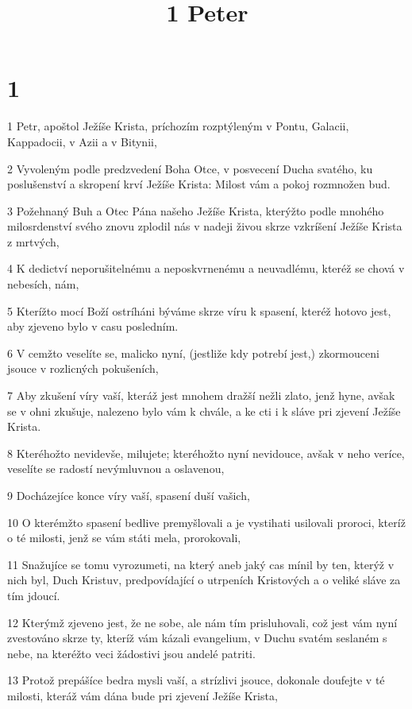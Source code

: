 

\title{1 Peter}

\chapter{1}

\par 1 Petr, apoštol Ježíše Krista, príchozím rozptýleným v Pontu, Galacii, Kappadocii, v Azii a v Bitynii,
\par 2 Vyvoleným podle predzvedení Boha Otce, v posvecení Ducha svatého, ku poslušenství a skropení krví Ježíše Krista: Milost vám a pokoj rozmnožen bud.
\par 3 Požehnaný Buh a Otec Pána našeho Ježíše Krista, kterýžto podle mnohého milosrdenství svého znovu zplodil nás v nadeji živou skrze vzkríšení Ježíše Krista z mrtvých,
\par 4 K dedictví neporušitelnému a neposkvrnenému a neuvadlému, kteréž se chová v nebesích, nám,
\par 5 Kterížto mocí Boží ostríháni býváme skrze víru k spasení, kteréž hotovo jest, aby zjeveno bylo v casu posledním.
\par 6 V cemžto veselíte se, malicko nyní, (jestliže kdy potrebí jest,) zkormouceni jsouce v rozlicných pokušeních,
\par 7 Aby zkušení víry vaší, kteráž jest mnohem dražší nežli zlato, jenž hyne, avšak se v ohni zkušuje, nalezeno bylo vám k chvále, a ke cti i k sláve pri zjevení Ježíše Krista.
\par 8 Kteréhožto nevidevše, milujete; kteréhožto nyní nevidouce, avšak v neho veríce, veselíte se radostí nevýmluvnou a oslavenou,
\par 9 Docházejíce konce víry vaší, spasení duší vašich,
\par 10 O kterémžto spasení bedlive premyšlovali a je vystihati usilovali proroci, kteríž o té milosti, jenž se vám státi mela, prorokovali,
\par 11 Snažujíce se tomu vyrozumeti, na který aneb jaký cas mínil by ten, kterýž v nich byl, Duch Kristuv, predpovídající o utrpeních Kristových a o veliké sláve za tím jdoucí.
\par 12 Kterýmž zjeveno jest, že ne sobe, ale nám tím prisluhovali, což jest vám nyní zvestováno skrze ty, kteríž vám kázali evangelium, v Duchu svatém seslaném s nebe, na kteréžto veci žádostivi jsou andelé patriti.
\par 13 Protož prepášíce bedra mysli vaší, a strízlivi jsouce, dokonale doufejte v té milosti, kteráž vám dána bude pri zjevení Ježíše Krista,
